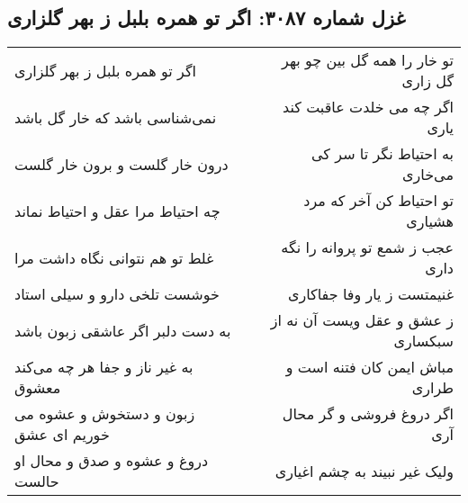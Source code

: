 \begin{center}
\section*{غزل شماره ۳۰۸۷: اگر تو همره بلبل ز بهر گلزاری}
\label{sec:3087}
\begin{longtable}{l p{0.5cm} r}
اگر تو همره بلبل ز بهر گلزاری
&&
تو خار را همه گل بین چو بهر گل زاری
\\
نمی‌شناسی باشد که خار گل باشد
&&
اگر چه می خلدت عاقبت کند یاری
\\
درون خار گلست و برون خار گلست
&&
به احتیاط نگر تا سر کی می‌خاری
\\
چه احتیاط مرا عقل و احتیاط نماند
&&
تو احتیاط کن آخر که مرد هشیاری
\\
غلط تو هم نتوانی نگاه داشت مرا
&&
عجب ز شمع تو پروانه را نگه داری
\\
خوشست تلخی دارو و سیلی استاد
&&
غنیمتست ز یار وفا جفاکاری
\\
به دست دلبر اگر عاشقی زبون باشد
&&
ز عشق و عقل ویست آن نه از سبکساری
\\
به غیر ناز و جفا هر چه می‌کند معشوق
&&
مباش ایمن کان فتنه است و طراری
\\
زبون و دستخوش و عشوه می خوریم ای عشق
&&
اگر دروغ فروشی و گر محال آری
\\
دروغ و عشوه و صدق و محال او حالست
&&
ولیک غیر نبیند به چشم اغیاری
\\
\end{longtable}
\end{center}
